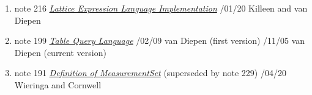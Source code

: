 \begin{enumerate}
\item
note 216
\href{216.html}{\textit{Lattice Expression Language Implementation}}
/01/20 Killeen and van Diepen

\item
note 199
\href{199.html}{\textit{Table Query Language}}
/02/09 van Diepen (first version)
/11/05 van Diepen (current version)

\item
note 191
\href{191.html}{\textit{Definition of MeasurementSet}} (superseded by
  note 229)
/04/20 Wieringa and Cornwell

\end{enumerate}
